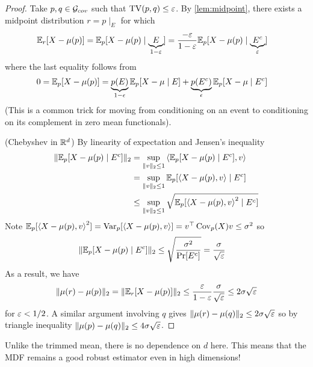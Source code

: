 \begin{proof}
    Take $p, q \in \mathcal{G}_{cov}$ such that $\operatorname{TV}(p, q) \leq \varepsilon$.
    By \cref{lem:midpoint}, there exists a midpoint distribution
    $r = p \mid_E$ for which
    \begin{align}
        \mathbb{E}_r[X - \mu(p)]
        &= \mathbb{E}_p[X - \mu(p) \mid \underbrace{E}_{1 - \varepsilon}]
        = \frac{-\varepsilon}{1 - \varepsilon} \mathbb{E}_p[X - \mu(p) \mid \underbrace{E^c}_{\varepsilon}]
    \end{align}
    where the last equality follows from
    \begin{align}
        0
        &= \mathbb{E}_p[X - \mu(p)]
        = \underbrace{p(E)}_{1-\epsilon} \mathbb{E}_p[ X - \mu \mid E] + \underbrace{p(E^c)}_{\epsilon} \mathbb{E}_p[X - \mu \mid E^c]
    \end{align}
    (This is a common trick for moving from conditioning on an event to
    conditioning on its complement in zero mean functionals).
    
    (Chebyshev in $\mathbb{R}^d$) By linearity of expectation and Jensen's inequality
    \begin{align}
        \| \mathbb{E}_p[X - \mu(p) \mid E^c] \|_2
        &= \sup_{\|v \|_2 \leq 1} \braket{\mathbb{E}_p[X - \mu(p) \mid E^c], v} \\
        &= \sup_{\|v\|_2 \leq 1} \mathbb{E}_p [\braket{X - \mu(p), v} \mid E^c] \\
        &\leq \sup_{\|v \|_2 \leq 1} \sqrt{\mathbb{E}_p[\braket{X - \mu(p), v}^2 \mid E^c]}
    \end{align}
    Note $\mathbb{E}_p[\braket{X - \mu(p), v}^2]
    = \operatorname{Var}_p[\braket{X - \mu(p), v}]
    = v^\top \operatorname{Cov}_p(X) v \leq \sigma^2$ so
    \begin{align}
        \| \mathbb{E}_p[X - \mu(p) \mid E^c] \|_2
        &\leq \sqrt{\frac{\sigma^2}{\Pr[E^c]}}
        = \frac{\sigma}{\sqrt{\varepsilon}}
        \label{eq:9-3-cheb-cov-control}
    \end{align}
    As a result, we have
    \begin{align}
        \|\mu(r) - \mu(p)\|_2 = \|\mathbb{E}_r[X - \mu(p)]\|_2 \leq \frac{\varepsilon}{1 - \varepsilon} \frac{\sigma}{\sqrt{\varepsilon}} \leq 2 \sigma \sqrt{\varepsilon}
    \end{align}
    for $\varepsilon < 1/2$.
    A similar argument involving $q$ gives $\|\mu(r) - \mu(q)\|_2 \leq 2 \sigma \sqrt{\varepsilon}$
    so by triangle inequality $\|\mu(p) - \mu(q)\|_2 \leq 4 \sigma \sqrt{\varepsilon}$.
\end{proof}

\begin{remark}
    Unlike the trimmed mean, there is no dependence on $d$ here.
    This means that the MDF remains a good robust estimator even in high dimensions!
\end{remark}

